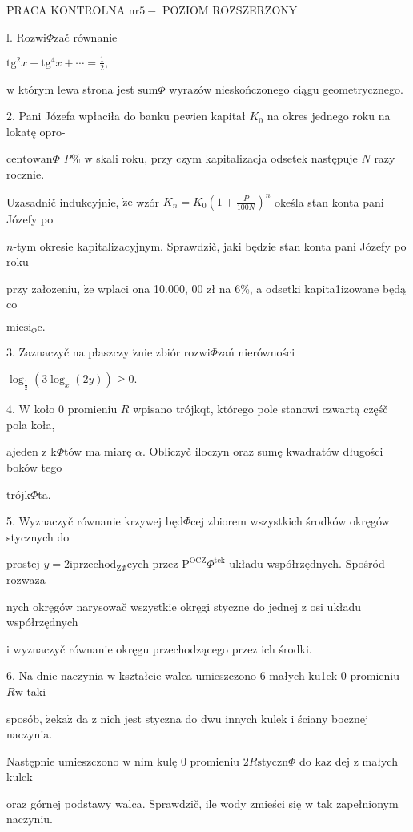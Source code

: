 \documentclass[a4paper,12pt]{article}
\begin{document}
PRACA KONTROLNA $\mathrm{n}\mathrm{r} 5-$ POZIOM ROZSZERZONY

l. Rozwi$\Phi$zač równanie

$\displaystyle \mathrm{t}\mathrm{g}^{2}x+\mathrm{t}\mathrm{g}^{4}x+\cdots=\frac{1}{2},$

$\mathrm{w}$ którym lewa strona jest $\mathrm{s}\mathrm{u}\mathrm{m}\Phi$ wyrazów nieskończonego ciągu geometrycznego.

2. Pani Józefa wpłaciła do banku pewien kapitał $K_{0}$ na okres jednego roku na lokatę opro-

$\mathrm{c}\mathrm{e}\mathrm{n}\mathrm{t}\mathrm{o}\mathrm{w}\mathrm{a}\mathrm{n}\Phi$ {\it P}\% $\mathrm{w}$ skali roku, przy czym kapitalizacja odsetek następuje $N$ razy rocznie.

Uzasadnič indukcyjnie, $\dot{\mathrm{z}}\mathrm{e}$ wzór $K_{n}=K_{0}(1+\displaystyle \frac{P}{100N})^{n}$ okeśla stan konta pani Józefy po

$n$-tym okresie kapitalizacyjnym. Sprawdzič, jaki będzie stan konta pani Józefy po roku

przy załozeniu, $\dot{\mathrm{z}}\mathrm{e}$ wplaci ona 10.000, 00 zł na 6\%, a odsetki kapita1izowane będą co

$\mathrm{m}\mathrm{i}\mathrm{e}\mathrm{s}\mathrm{i}_{\Phi}\mathrm{c}.$

3. Zaznaczyč na płaszczy $\acute{\mathrm{z}}\mathrm{n}\mathrm{i}\mathrm{e}$ zbiór rozwi$\Phi$zań nierówności

$\log_{\frac{1}{2}}(3\log_{x}(2y))\geq 0.$

4. $\mathrm{W}$ koło $0$ promieniu $R$ wpisano trójkqt, którego pole stanowi czwartą częśč pola koła,

ajeden $\mathrm{z}$ k$\Phi$tów ma miarę $\alpha$. Obliczyč iloczyn oraz sumę kwadratów długości boków tego

trójk$\Phi$ta.

5. Wyznaczyč równanie krzywej będ$\Phi$cej zbiorem wszystkich środków okręgów stycznych do

prostej $y=2\mathrm{i}\mathrm{p}\mathrm{r}\mathrm{z}\mathrm{e}\mathrm{c}\mathrm{h}\mathrm{o}\mathrm{d}_{\mathrm{Z}\Phi}$cych przez $\mathrm{P}^{\mathrm{O}\mathrm{C}\mathrm{Z}}\Phi^{\mathrm{t}\mathrm{e}\mathrm{k}}$ układu współrzędnych. Spośród rozwaza-

nych okręgów narysowač wszystkie okręgi styczne do jednej $\mathrm{z}$ osi układu współrzędnych

$\mathrm{i}$ wyznaczyč równanie okręgu przechodzącego przez ich środki.

6. Na dnie naczynia $\mathrm{w}$ kształcie walca umieszczono 6 małych ku1ek $0$ promieniu $R\mathrm{w}$ taki

sposób, $\dot{\mathrm{z}}\mathrm{e}\mathrm{k}\mathrm{a}\dot{\mathrm{z}}$ da $\mathrm{z}$ nich jest styczna do dwu innych kulek $\mathrm{i}$ ściany bocznej naczynia.

Następnie umieszczono $\mathrm{w}$ nim kulę $0$ promieniu $ 2R\mathrm{s}\mathrm{t}\mathrm{y}\mathrm{c}\mathrm{z}\mathrm{n}\Phi$ do $\mathrm{k}\mathrm{a}\dot{\mathrm{z}}$ dej $\mathrm{z}$ małych kulek

oraz górnej podstawy walca. Sprawdzič, ile wody zmieści się $\mathrm{w}$ tak zapełnionym naczyniu.
\end{document}
